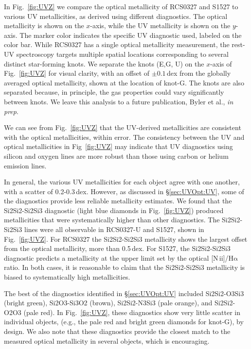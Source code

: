 \documentclass[preprint2]{aastex62}
\newcommand{\nii}{[N\,{\sc ii}]\xspace}
\newcommand{\ha}{\ensuremath{\mathrm{H\alpha}}\xspace}
\begin{document}
In Fig.~\ref{fig:UVZ} we compare the optical metallicity of RCS0327 and S1527 to various UV metallicities, as derived using different diagnostics. The optical metallicity is shown on the $x$-axis, while the UV metallicity is shown on the $y$-axis. The marker color indicates the specific UV diagnostic used, labeled on the color bar. While RCS0327 has a single optical metallicity measurement, the rest-UV spectroscopy targets multiple spatial locations corresponding to several distinct star-forming knots. We separate the knots (E,G, U) on the $x$-axis of Fig.~\ref{fig:UVZ} for visual clarity, with an offset of $\pm 0.1$\,dex from the globally averaged optical metallicity, shown at the location of knot-G. The knots are also separated because, in principle, the gas properties could vary significantly between knots. We leave this analysis to a future publication, Byler et al., \emph{in prep}.

We can see from Fig.~\ref{fig:UVZ} that the UV-derived metallicities are consistent with the optical metallicities, within error. The consistency between the UV and optical metallicities in Fig~\ref{fig:UVZ} may indicate that UV diagnostics using silicon and oxygen lines are more robust than those using carbon or helium emission lines.

In general, the various UV metallicities for each object agree with one another, with a scatter of 0.2-0.3\,dex. However, as discussed in \S\ref{sec:UVOpt:UV}, some of the diagnostics provide less reliable metallicity estimates. We found that the Si2Si2-Si2Si3 diagnostic (light blue diamonds in Fig.~\ref{fig:UVZ}) produced metallicities that were systematically higher than other diagnostics. The Si2Si2-Si2Si3 lines were all observable in RCS0327-U and S1527, shown in Fig.~\ref{fig:UVZ}. For RCS0327 the Si2Si2-Si2Si3 metallicity shows the largest offset from the optical metallicity, more than 0.5\,dex. For S1527, the Si2Si2-Si2Si3 diagnostic predicts a metallicity at the upper limit set by the optical \nii/\ha ratio. In both cases, it is reasonable to claim that the Si2Si2-Si2Si3 metallicity is biased to systematically high metallicities.

The best of the diagnostics identified in \S\ref{sec:UVOpt:UV} included Si2Si2-O3Si3 (bright green), Si2O3-Si3O2 (brown), Si2Si2-N3Si3 (pale orange), and Si2Si2-O2O3 (pale red). In Fig.~\ref{fig:UVZ}, these diagnostics show very little scatter in individual objects, (e.g., the pale red and bright green diamonds for knot-G), by design. We also note that these diagnostics provide the closest match to the measured optical metallicity in several objects, which is encouraging.
\end{document}
